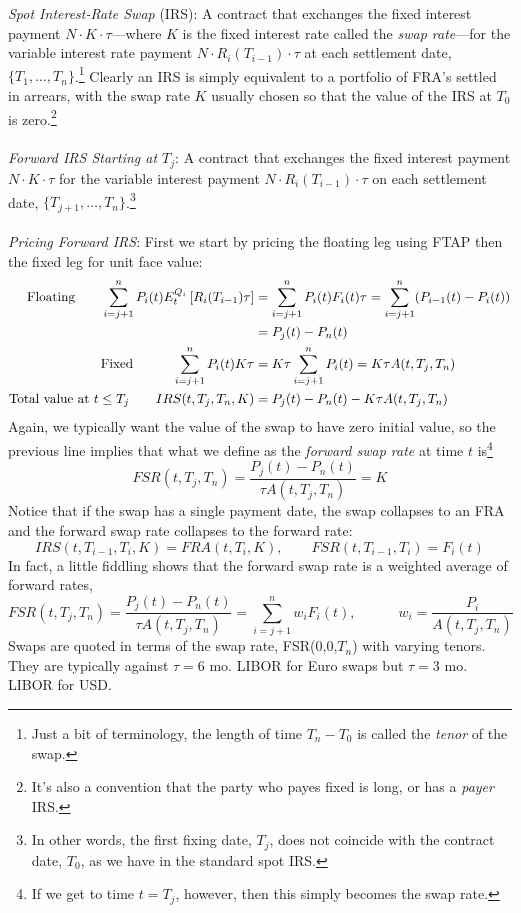 \documentclass[a4paper,12pt]{scrartcl}
\begin{document}
{\sl Spot Interest-Rate Swap} (IRS): A contract that exchanges
the fixed interest payment $N \cdot K \cdot \tau$---where $K$ is the
fixed interest rate called the \emph{swap rate}---for the variable
interest rate payment $N\cdot R_i(T_{i-1}) \cdot \tau$ at each
settlement date, $\{T_1, \ldots, T_n\}$.\footnote{Just a bit of 
terminology, the length of time $T_n-T_0$ is called the \emph{tenor} of 
the swap.}  Clearly an IRS is simply equivalent to a portfolio of 
FRA's settled in arrears, with the swap rate $K$ usually chosen 
so that the value of the IRS at $T_0$ is zero.\footnote{It's also
a convention that the party who payes fixed is long, or has a 
\emph{payer} IRS.}
\\
\\
{\sl Forward IRS Starting at $T_j$}: A contract that exchanges the
fixed interest payment $N\cdot K \cdot \tau$ for the 
variable interest payment $N\cdot R_i(T_{i-1}) \cdot \tau$ on
each settlement date, $\{T_{j+1}, \ldots, T_n\}$.\footnote{In other
words, the first fixing date, $T_j$, does not coincide with
the contract date, $T_0$, as we have in the standard spot IRS.} 
\\
\\
{\sl Pricing Forward IRS}: First we start by pricing the floating leg
using FTAP then the fixed leg for unit face value:
\begin{align*}
   \text{Floating} \qquad \hfill
   \sum^n_{i=j+1} P_i(t) E^{Q_i}_t \left[ R_i(T_{i-1})\tau \right]
      &=\sum^n_{i=j+1} P_i(t) F_i(t)\tau 
      = \sum^n_{i=j+1} (P_{i-1}(t) - P_i(t)) \\
      &= P_j(t) - P_n(t) \\
   \text{Fixed} \qquad\quad
   \sum^n_{i=j+1} P_i(t)K\tau &=  K \tau \sum^n_{i=j+1} P_i(t)  
      = K \tau A(t,T_j,T_n) \\
   \text{Total value at $t\leq T_j$} \qquad 
   IRS(t,T_j, T_n, K) &= P_j(t) - P_n(t) - K\tau A(t,T_j,T_n)
\end{align*}
Again, we typically want the value of the swap to have zero initial
value, so the previous line implies that what we define as the  
\emph{forward swap rate} at time $t$ is\footnote{If we
get to time $t=T_j$, however, then this simply becomes the swap rate.}
   \[ FSR(t, T_j, T_n) = \frac{P_j(t) - P_n(t)}{\tau A(t,T_j,T_n)} =K \]
Notice that if the swap has a single payment date, the swap collapses
to an FRA and the forward swap rate collapses to the forward rate:
   \[ IRS(t,T_{i-1},T_i,K) = FRA(t,T_i,K), \qquad 
       FSR(t,T_{i-1},T_i) = F_i(t) \]
In fact, a little fiddling shows that the forward swap rate is a 
weighted average of forward rates,
\[ FSR(t,T_j, T_n) = \frac{P_j(t) - P_n(t)}{\tau A(t,T_j,T_n)} = 
   \sum^n_{i=j+1} w_i F_i(t),\qquad\quad w_i = \frac{P_i}{A(t,T_j,T_n)}
   \]
Swaps are quoted in terms of the swap rate, FSR(0,0,$T_n$) with
varying tenors. They are typically against $\tau = 6$ mo. LIBOR 
for Euro swaps but $\tau=3$ mo. LIBOR for USD.
\end{document}
